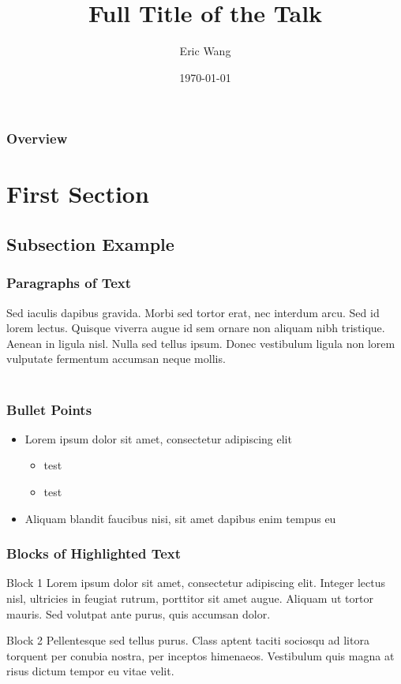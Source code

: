 \documentclass{beamer}
\title[Short title]{Full Title of the Talk}
\author{Eric Wang}
\institute[ECPKN]{
Ecole Centrale de P\'ekin\\
\medskip
\textit{wangchaogo1990 dot at gmail.com}
}
\date{\today} %
\begin{document}
\begin{frame}[fragile]
\thispagestyle{empty}
\titlepage
\end{frame}

\begin{frame}[fragile]
\frametitle{Overview}
\tableofcontents
\end{frame}

\section{First Section}
\subsection{Subsection Example}

\begin{frame}[fragile]
\frametitle{Paragraphs of Text}
Sed iaculis dapibus gravida. Morbi sed tortor erat, nec interdum arcu. Sed id lorem lectus. Quisque viverra augue id sem ornare non aliquam nibh tristique. Aenean in ligula nisl. Nulla sed tellus ipsum. Donec vestibulum ligula non lorem vulputate fermentum accumsan neque mollis.\\~\\
\end{frame}

\begin{frame}[fragile]
\frametitle{Bullet Points}
\begin{itemize}
\item Lorem ipsum dolor sit amet, consectetur adipiscing elit
	\begin{itemize}
	\item test
	\item test
	\end{itemize}
\item Aliquam blandit faucibus nisi, sit amet dapibus enim tempus eu
\end{itemize}
\end{frame}

\begin{frame}[fragile]
\frametitle{Blocks of Highlighted Text}
\begin{block}{Block 1}
Lorem ipsum dolor sit amet, consectetur adipiscing elit. Integer lectus nisl, ultricies in feugiat rutrum, porttitor sit amet augue. Aliquam ut tortor mauris. Sed volutpat ante purus, quis accumsan dolor.
\end{block}

\begin{block}{Block 2}
Pellentesque sed tellus purus. Class aptent taciti sociosqu ad litora torquent per conubia nostra, per inceptos himenaeos. Vestibulum quis magna at risus dictum tempor eu vitae velit.
\end{block}
\end{frame}
\end{document}
